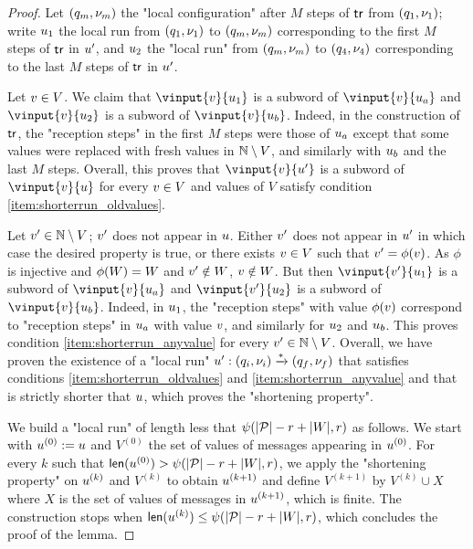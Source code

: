\begin{proof}
	Let $(q_m, \nu_m)$ the "local configuration" after $M$ steps of $\mathsf{tr}$ from $(q_1, \nu_1)$; write $u_1$ the local run from $(q_1,\nu_1)$ to $(q_m, \nu_m)$ corresponding to the first $M$ steps of $\mathsf{tr}$ in $u'$, and $u_2$ the "local run" from $(q_m, \nu_m)$ to $(q_4, \nu_4)$ corresponding to the last $M$ steps of $\mathsf{tr}$ in $u'$.  
	
	Let $v \in V$. We claim that $\vinput{\aval}{\localrun_{1}}$ is a subword of $\vinput{\aval}{\localrun_a}$ and $\vinput{\aval}{\localrun_{2}}$ is a subword of $\vinput{\aval}{\localrun_b}$. Indeed, in the construction of $\mathsf{tr}$, the "reception steps" in the first $M$ steps were those of $u_a$ except that some values were replaced with fresh values in $\mathbb{N} \setminus V$, and similarly with $u_b$ and the last $M$ steps. Overall, this proves that $\vinput{\aval}{\localrun'}$ is a subword of $\vinput{\aval}{\localrun}$ for every $v \in V$ and values of $V$ satisfy condition  \ref{item:shorterrun_oldvalues}. 
	
	Let $v' \in \mathbb{N} \setminus V$; $v'$ does not appear in $u$. Either $v'$ does not appear in $u'$ in which case the desired property is true, or there exists $v \in V$ such that $v' = \phi(v)$. As $\phi$ is injective and $\phi(W) = W$ and $v'\notin W$, $v \notin W$. 
	But then $\vinput{\aval'}{\localrun_{1}}$ is a subword of $\vinput{\aval}{\localrun_a}$ and $\vinput{\aval'}{\localrun_{2}}$ is a subword of $\vinput{\aval}{\localrun_b}$. Indeed, in $u_1$, the "reception steps" with value $\phi(v)$ correspond to "reception steps" in $u_a$ with value $v$, and similarly for $u_2$ and $u_b$. This proves condition \ref{item:shorterrun_anyvalue} for every $v' \in \mathbb{N} \setminus V$.
	Overall, we have proven the existence of a "local run" $u': (q_i,\nu_i) \xrightarrow{*} (q_f,\nu_f)$ that satisfies conditions \ref{item:shorterrun_oldvalues} and \ref{item:shorterrun_anyvalue} and that is strictly shorter that $u$, which proves the "shortening property".
	
	We build a "local run" of length less that $\psi(|\mathcal{P}|-r+|W|,r)$ as follows. We start with $u^{(0)} := u$ and $V^{(0)}$ the set of values of messages appearing in $u^{(0)}$. For every $k$ such that $\mathsf{len}(u^{(0)}) > \psi(|\mathcal{P}|-r+|W|,r)$, we apply the "shortening property" on $u^{(k)}$ and $V^{(k)}$ to obtain $u^{(k+1)}$ and define $V^{(k+1)}$ by $V^{(k)} \cup X$ where $X$ is the set of values of messages in $u^{(k+1)}$, which is finite.
	The construction stops when $\mathsf{len}(u^{(k)}) \leq \psi(|\mathcal{P}|-r + |W|,r)$, which concludes the proof of the lemma. 
\end{proof}


